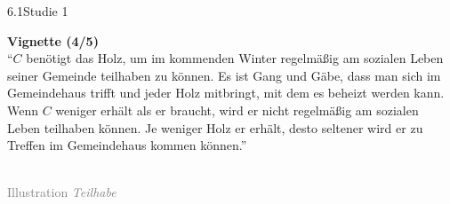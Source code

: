 \documentclass[xcolor=table,9pt,aspectratio=169]{beamer}
\begin{document}
\begin{frame}{\vspace*{10mm}6.1\hspace*{1em}Studie 1}
\begin{multicols}{2}
   \textbf{Vignette (4/5)}\\
   \medskip
   \enquote{$C$ benötigt das Holz, um im kommenden Winter regelmäßig am sozialen Leben seiner Gemeinde teilhaben zu können. Es ist Gang und Gäbe, dass man sich im Gemeindehaus trifft und jeder Holz mitbringt, mit dem es beheizt werden kann. Wenn $C$ weniger erhält als er braucht, wird er nicht regelmäßig am sozialen Leben teilhaben können. Je weniger Holz er erhält, desto seltener wird er zu Treffen im Gemeindehaus kommen können.}
   \vfill
   \begin{center}
      \\
      \textcolor{gray}{Illustration \textit{Teilhabe}}
   \end{center}
\end{multicols}
\end{frame}
\end{document}
